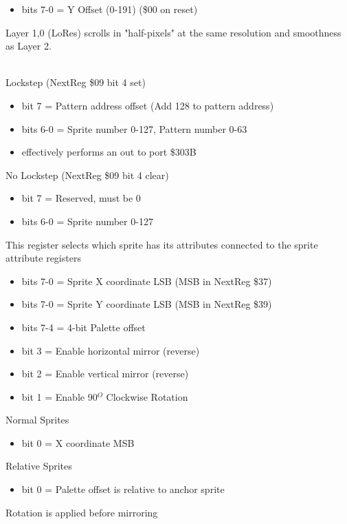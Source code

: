 \begin{itemize}
\item bits 7-0 = Y Offset (0-191) (\$00 on reset)
\end{itemize}
Layer 1,0 (LoRes) scrolls in "half-pixels" at the same resolution and
smoothness as Layer 2.

\\
Lockstep (NextReg \$09 bit 4 set)
\begin{itemize}
\item bit 7 = Pattern address offset (Add 128 to pattern address)
\item bits 6-0 = Sprite number 0-127, Pattern number 0-63
\item[] effectively performs an out to port \$303B
\end{itemize}
No Lockstep (NextReg \$09 bit 4 clear)
\begin{itemize}
\item bit 7 = Reserved, must be 0
\item bits 6-0 = Sprite number 0-127
\end{itemize}
This register selects which sprite has its attributes connected to the
sprite attribute registers

\begin{itemize}
\item bits 7-0 = Sprite X coordinate LSB (MSB in NextReg \$37)
\end{itemize}

\begin{itemize}
\item bits 7-0 = Sprite Y coordinate LSB (MSB in NextReg \$39)
\end{itemize}

\begin{itemize}
\item bits 7-4 = 4-bit Palette offset
\item bit 3 = Enable horizontal mirror (reverse)
\item bit 2 = Enable vertical mirror (reverse)
\item bit 1 = Enable 90$^O$  Clockwise Rotation
\end{itemize}
Normal Sprites
\begin{itemize}
\item bit 0 = X coordinate MSB
\end{itemize}
Relative Sprites
\begin{itemize}
\item bit 0 = Palette offset is relative to anchor sprite
\end{itemize}
Rotation is applied before mirroring

